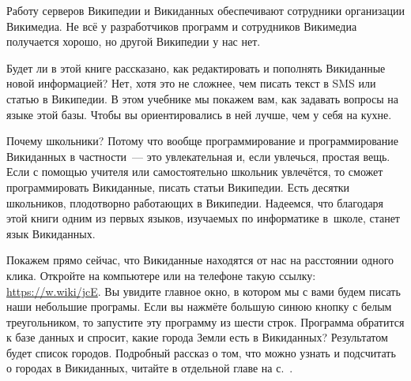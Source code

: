Работу серверов Википедии и Викиданных обеспечивают сотрудники организации Викимедиа. 
Не всё у разработчиков программ и сотрудников Викимедиа получается хорошо, 
но другой Википедии у нас нет.

Будет ли в этой книге рассказано, как редактировать и пополнять Викиданные 
новой информацией? Нет, хотя это не сложнее, чем писать текст в SMS 
или статью в Википедии. В этом учебнике мы покажем вам, 
как задавать вопросы на языке этой базы. 
Чтобы вы ориентировались в ней лучше, чем у себя на кухне. 

Почему школьники? 
Потому что вообще программирование и программирование Викиданных в частности~--- это 
увлекательная и, если увлечься, простая вещь. 
Если с помощью учителя или самостоятельно школьник увлечётся, 
то сможет программировать Викиданные, писать статьи Википедии. 
Есть десятки школьников, плодотворно работающих в Википедии. 
Надеемся, что благодаря этой книги одним из первых языков, 
изучаемых по информатике в~школе, станет язык Викиданных.

Покажем прямо сейчас, что Викиданные находятся от нас на расстоянии одного клика.
Откройте на компьютере или на телефоне такую ссылку: 
\href{https://w.wiki/jcE}{https://w.wiki/jcE}. 
Вы увидите главное окно, в котором мы с вами будем писать наши небольшие програмы. 
Если вы нажмёте большую синюю кнопку с белым треугольником, 
то запустите 
эту программу из шести строк. Программа обратится к базе данных 
и спросит, какие города Земли есть в Викиданных?
Результатом будет список городов. 
Подробный рассказ о том, что можно узнать и подсчитать о городах в Викиданных,  
читайте в отдельной главе на с.~\pageref{ch:city}. 
